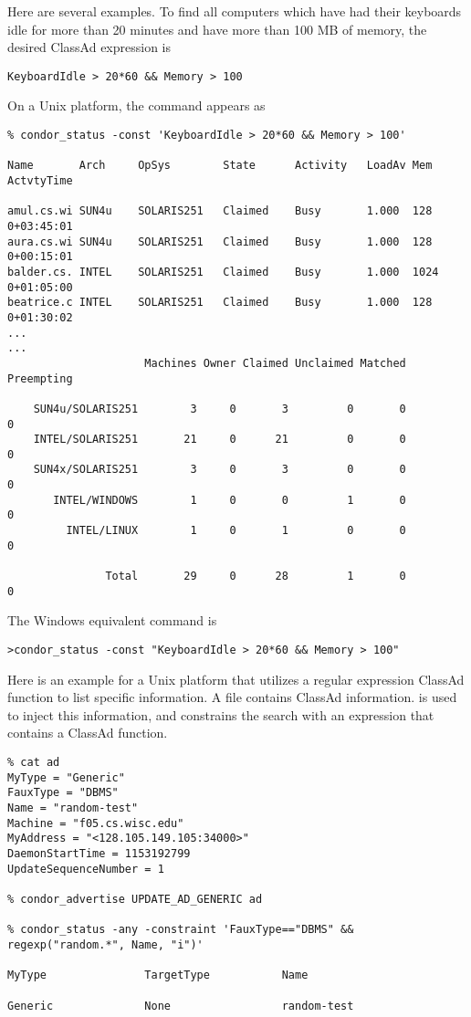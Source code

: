 Here are several examples.
To find all computers which have had their keyboards idle for 
more than 20 minutes and have more than 100 MB of memory,
the desired ClassAd expression is
\footnotesize
\begin{verbatim}
KeyboardIdle > 20*60 && Memory > 100
\end{verbatim}
\normalsize
On a Unix platform, the command appears as
\footnotesize
\begin{verbatim}
% condor_status -const 'KeyboardIdle > 20*60 && Memory > 100'

Name       Arch     OpSys        State      Activity   LoadAv Mem  ActvtyTime

amul.cs.wi SUN4u    SOLARIS251   Claimed    Busy       1.000  128   0+03:45:01
aura.cs.wi SUN4u    SOLARIS251   Claimed    Busy       1.000  128   0+00:15:01
balder.cs. INTEL    SOLARIS251   Claimed    Busy       1.000  1024  0+01:05:00
beatrice.c INTEL    SOLARIS251   Claimed    Busy       1.000  128   0+01:30:02
...
...
                     Machines Owner Claimed Unclaimed Matched Preempting

    SUN4u/SOLARIS251        3     0       3         0       0          0
    INTEL/SOLARIS251       21     0      21         0       0          0
    SUN4x/SOLARIS251        3     0       3         0       0          0
       INTEL/WINDOWS        1     0       0         1       0          0
         INTEL/LINUX        1     0       1         0       0          0

               Total       29     0      28         1       0          0
\end{verbatim}
\normalsize

The Windows equivalent command is
\footnotesize
\begin{verbatim}
>condor_status -const "KeyboardIdle > 20*60 && Memory > 100"
\end{verbatim}
\normalsize

Here is an example for a Unix platform that utilizes a regular expression
ClassAd function to list specific information.
A file contains ClassAd information.
 is used to inject this information,
and  constrains the search with an expression
that contains a ClassAd function.

\footnotesize
\begin{verbatim}
% cat ad
MyType = "Generic"
FauxType = "DBMS"
Name = "random-test"
Machine = "f05.cs.wisc.edu"
MyAddress = "<128.105.149.105:34000>"
DaemonStartTime = 1153192799
UpdateSequenceNumber = 1

% condor_advertise UPDATE_AD_GENERIC ad

% condor_status -any -constraint 'FauxType=="DBMS" && regexp("random.*", Name, "i")'

MyType               TargetType           Name                          

Generic              None                 random-test                   

\end{verbatim}
\normalsize

